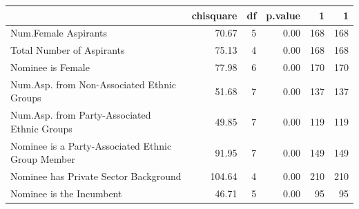 \begin{table}[ht]
\centering
\label{tab:imbalance.pm}
\begin{tabular}{lrrrrr}
  \hline
 & chisquare & df & p.value & 1 & 1 \\ 
  \hline
Num.Female Aspirants & 70.67 & 5 & 0.00 & 168 & 168 \\ 
  Total Number of Aspirants & 75.13 & 4 & 0.00 & 168 & 168 \\ 
  Nominee is Female & 77.98 & 6 & 0.00 & 170 & 170 \\ 
  Num.Asp. from Non-Associated Ethnic Groups & 51.68 & 7 & 0.00 & 137 & 137 \\ 
  Num.Asp. from Party-Associated Ethnic Groups & 49.85 & 7 & 0.00 & 119 & 119 \\ 
  Nominee is a Party-Associated Ethnic Group Member & 91.95 & 7 & 0.00 & 149 & 149 \\ 
  Nominee has Private Sector Background & 104.64 & 4 & 0.00 & 210 & 210 \\ 
  Nominee is the Incumbent & 46.71 & 5 & 0.00 & 95 & 95 \\ 
   \hline
\end{tabular}
\end{table}
